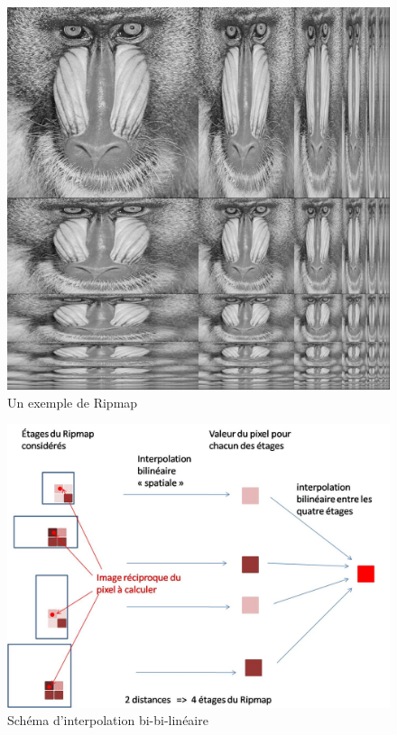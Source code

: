 \begin{figure}[h!]
\centering
\caption{Un exemple de Ripmap}
\includegraphics[scale=0.4]{Ripmap_real}
\end{figure}


\begin{figure}[h!]
\centering
\caption{Schéma d'interpolation bi-bi-linéaire}
\includegraphics[scale=0.5]{interbibilineaire.jpg}
\end{figure}


